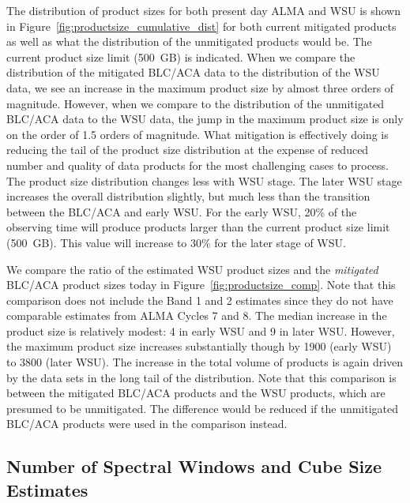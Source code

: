 \documentclass[preprint]{aastex631}
\begin{document}
The distribution of product sizes for both present day ALMA and WSU is shown in Figure~\ref{fig:productsize_cumulative_dist} for both current mitigated products as well as what the distribution of the unmitigated products would be. The current product size limit (500~GB) is indicated. When we compare the distribution of the mitigated BLC/ACA data to the distribution of the WSU data, we see an increase in the maximum product size by almost three orders of magnitude. However, when we compare to the distribution of the unmitigated BLC/ACA data to the WSU data, the jump in the maximum product size is only on the order of 1.5 orders of magnitude. What mitigation is effectively doing is reducing the tail of the product size distribution at the expense of reduced number and quality of data products for the most challenging cases to process. The product size distribution changes less with WSU stage.  The later WSU stage increases the overall distribution slightly, but much less than the transition between the BLC/ACA and early WSU. For the early WSU, 20\% of the observing time will produce products larger than the current product size limit (500~GB). This value will increase to 30\% for the later stage of WSU.

We compare the ratio of the estimated WSU product sizes and the {\it mitigated} BLC/ACA product sizes today in Figure~\ref{fig:productsize_comp}. Note that this comparison does not include the Band 1 and 2 estimates since they do not have comparable estimates from ALMA Cycles 7 and 8. The median increase in the product size is relatively modest: 4 in early WSU and  9 in later WSU. However,  the maximum product size increases substantially though by 1900 (early WSU) to 3800 (later WSU). The increase in the total volume of products is again driven by the data sets in the long tail of the distribution. Note that this comparison is between the mitigated BLC/ACA products and the WSU products, which are presumed to be unmitigated. The difference would be reduced if the unmitigated BLC/ACA products were used in the comparison instead.



\subsection{Number of Spectral Windows and Cube Size Estimates} \label{sec:results_cubesize}
\end{document}
